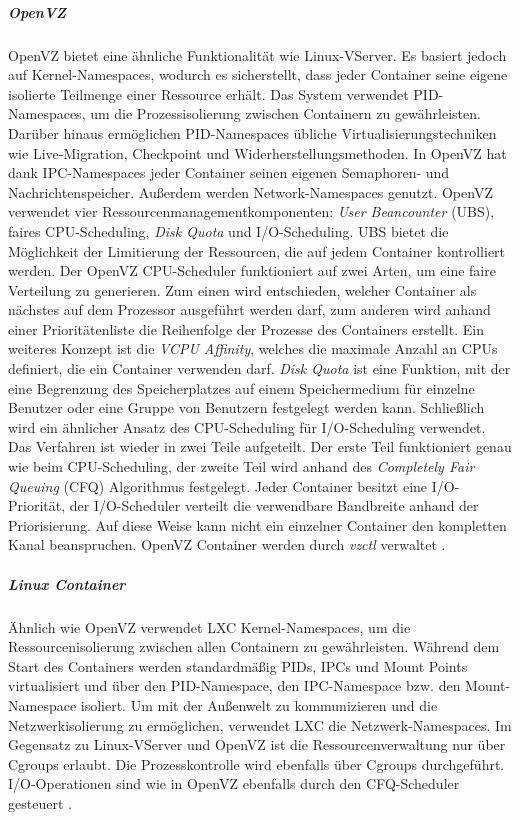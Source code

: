 \subparagraph{OpenVZ}
OpenVZ bietet eine ähnliche Funktionalität wie Linux-VServer. Es basiert jedoch auf Kernel-Namespaces, wodurch es sicherstellt, dass jeder Container seine eigene isolierte Teilmenge einer Ressource erhält. Das System verwendet PID-Namespaces, um die Prozessisolierung zwischen Containern zu gewährleisten. Darüber hinaus ermöglichen PID-Namespaces übliche Virtualisierungstechniken wie Live-Migration, Checkpoint und Widerherstellungsmethoden. In OpenVZ hat dank IPC-Namespaces jeder Container seinen eigenen Semaphoren- und Nachrichtenspeicher. Außerdem werden Network-Namespaces genutzt. OpenVZ verwendet vier Ressourcenmanagementkomponenten: \emph{User Beancounter} (UBS), faires CPU-Scheduling, \emph{Disk Quota} und I/O-Scheduling. UBS bietet die Möglichkeit der Limitierung der Ressourcen, die auf jedem Container kontrolliert werden. Der OpenVZ CPU-Scheduler funktioniert auf zwei Arten, um eine faire Verteilung zu generieren. Zum einen wird entschieden, welcher Container als nächstes auf dem Prozessor ausgeführt werden darf, zum anderen wird anhand einer Prioritätenliste die Reihenfolge der Prozesse des Containers erstellt. Ein weiteres Konzept ist die \emph{VCPU Affinity}, welches die maximale Anzahl an CPUs definiert, die ein Container verwenden darf. \emph{Disk Quota} ist eine Funktion, mit der eine Begrenzung des Speicherplatzes auf einem Speichermedium für einzelne Benutzer oder eine Gruppe von Benutzern festgelegt werden kann. Schließlich wird ein ähnlicher Ansatz des CPU-Scheduling für I/O-Scheduling verwendet. Das Verfahren ist wieder in zwei Teile aufgeteilt. Der erste Teil funktioniert genau wie beim CPU-Scheduling, der zweite Teil wird anhand des \emph{Completely Fair Queuing} (CFQ) Algorithmus festgelegt. Jeder Container besitzt eine I/O-Priorität, der I/O-Scheduler verteilt die verwendbare Bandbreite anhand der Priorisierung. Auf diese Weise kann nicht ein einzelner Container den kompletten Kanal beanspruchen. OpenVZ Container werden durch \emph{vzctl} \cite{ParallelsIPHoldingsGMbH2018Vzctl} verwaltet \cite{IndexOpenvz.org} \cite{Xavier2015AClouds}.

\subparagraph{Linux Container}
Ähnlich wie OpenVZ verwendet LXC Kernel-Namespaces, um die Ressourcenisolierung zwischen allen Containern zu gewährleisten. Während dem Start des Containers werden standardmäßig PIDs, IPCs und Mount Points virtualisiert und über den PID-Namespace, den IPC-Namespace bzw. den Mount-Namespace isoliert. Um mit der Außenwelt zu kommunizieren und die Netzwerkisolierung zu ermöglichen, verwendet LXC die Netzwerk-Namespaces. Im Gegensatz zu Linux-VServer und OpenVZ ist die Ressourcenverwaltung nur über Cgroups erlaubt. Die Prozesskontrolle wird ebenfalls über Cgroups durchgeführt. I/O-Operationen sind wie in OpenVZ ebenfalls durch den CFQ-Scheduler gesteuert \cite{IndexLinuxcontainers.Org} \cite{Xavier2015AClouds}.

